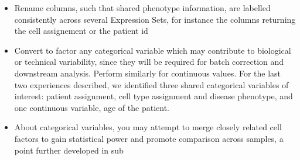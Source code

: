\begin{itemize}
\item
  Rename columns, such that shared phenotype information, are labelled consistently across several Expression Sets, for instance the columns returning the cell assignement or the patient id
\item
  Convert to factor any categorical variable which may contribute to biological or technical variability, since they will be required for batch correction and downstream analysis. Perform similarly for continuous values. For the last two experiences described, we identified three shared categorical variables of interest: patient assignment, cell type assignment and disease phenotype, and one continuous variable, age of the patient.
\item
  About categorical variables, you may attempt to merge closely related cell factors to gain statistical power and promote comparison across samples, a point further developed in sub
\end{itemize}

